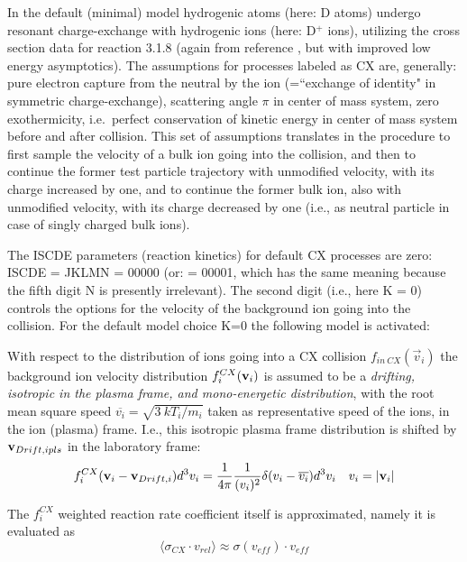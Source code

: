 In the default (minimal) model hydrogenic atoms (here: D atoms) undergo
resonant charge-exchange with hydrogenic ions (here: D$^+$ ions), utilizing the
cross section data for reaction 3.1.8 (again from reference \cite{kn:Janev},
but with improved low energy asymptotics).
The assumptions for processes labeled as CX are, generally: pure electron
capture from the neutral by the ion (=``exchange of identity" in symmetric
charge-exchange), scattering angle $\pi$ in center of mass system, zero
exothermicity, i.e.\ perfect conservation of kinetic energy in center of mass
system before and after collision.
This set of assumptions translates in the procedure to first sample the
velocity of a bulk ion going into the collision, and then to continue the
former test particle trajectory with unmodified velocity, with its charge
increased by one, and to continue the former bulk ion, also with unmodified
velocity, with its charge decreased by one (i.e., as neutral particle in case
of singly charged bulk ions).

The ISCDE parameters (reaction kinetics) for default CX processes are zero:
ISCDE = JKLMN = 00000 (or: = 00001, which has the same meaning because the
fifth digit N is presently irrelevant).
The second digit (i.e., here K = 0) controls the options for the velocity of
the background ion going into the collision.
For the default model choice K=0 the following model is activated:

With respect to the distribution of ions going into a CX collision 
$f_{in \ CX}(\vec v_i)$ the background ion velocity distribution 
$f_i^{CX}(\mathbf{v}_i)$ is assumed to be a \emph{drifting, isotropic in the plasma 
frame, and mono-energetic distribution}, with the root mean square speed 
$\overline{v_i} = \sqrt{3 ~ kT_i/m_i}$ taken as representative speed of the 
ions, in the ion (plasma) frame.
I.e., this isotropic plasma frame distribution is shifted by $\mathbf{v}_{Drift,ipls}$
in the laboratory frame:
\begin{equation}
  \label{iso-mono}
  f_i^{CX}
  (\mathbf{v}_i-\mathbf{v}_{Drift,i})d^3v_i =
  \frac{1}{4\pi}\frac{1}{(v_i)^2}\delta(v_i-\overline{v_i})d^3v_i \quad  v_i =
  |\mathbf{v}_i|
\end{equation}

The $f_i^{CX}$ weighted reaction rate coefficient itself is approximated,
namely it is evaluated as
\begin{equation}
  \label{sigveff} \langle\sigma_{CX}
  \cdot v_{rel}\rangle \approx \sigma(v_{eff}) \cdot v_{eff}
\end{equation}

